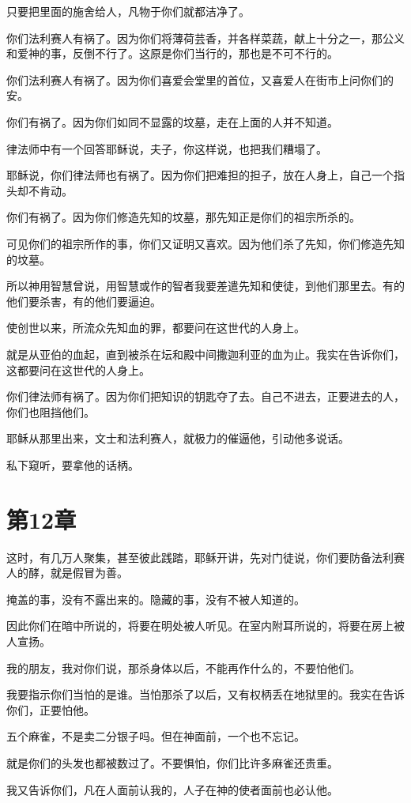 \documentclass[12pt,oneside]{book}
\begin{document}
只要把里面的施舍给人，凡物于你们就都洁净了。

你们法利赛人有祸了。因为你们将薄荷芸香，并各样菜蔬，献上十分之一，那公义和爱神的事，反倒不行了。这原是你们当行的，那也是不可不行的。

你们法利赛人有祸了。因为你们喜爱会堂里的首位，又喜爱人在街市上问你们的安。

你们有祸了。因为你们如同不显露的坟墓，走在上面的人并不知道。

律法师中有一个回答耶稣说，夫子，你这样说，也把我们糟塌了。

耶稣说，你们律法师也有祸了。因为你们把难担的担子，放在人身上，自己一个指头却不肯动。

你们有祸了。因为你们修造先知的坟墓，那先知正是你们的祖宗所杀的。

可见你们的祖宗所作的事，你们又证明又喜欢。因为他们杀了先知，你们修造先知的坟墓。

所以神用智慧曾说，用智慧或作的智者我要差遣先知和使徒，到他们那里去。有的他们要杀害，有的他们要逼迫。

使创世以来，所流众先知血的罪，都要问在这世代的人身上。

就是从亚伯的血起，直到被杀在坛和殿中间撒迦利亚的血为止。我实在告诉你们，这都要问在这世代的人身上。

你们律法师有祸了。因为你们把知识的钥匙夺了去。自己不进去，正要进去的人，你们也阻挡他们。

耶稣从那里出来，文士和法利赛人，就极力的催逼他，引动他多说话。

私下窥听，要拿他的话柄。

\chapter{第12章}
这时，有几万人聚集，甚至彼此践踏，耶稣开讲，先对门徒说，你们要防备法利赛人的酵，就是假冒为善。

掩盖的事，没有不露出来的。隐藏的事，没有不被人知道的。

因此你们在暗中所说的，将要在明处被人听见。在室内附耳所说的，将要在房上被人宣扬。

我的朋友，我对你们说，那杀身体以后，不能再作什么的，不要怕他们。

我要指示你们当怕的是谁。当怕那杀了以后，又有权柄丢在地狱里的。我实在告诉你们，正要怕他。

五个麻雀，不是卖二分银子吗。但在神面前，一个也不忘记。

就是你们的头发也都被数过了。不要惧怕，你们比许多麻雀还贵重。

我又告诉你们，凡在人面前认我的，人子在神的使者面前也必认他。
\end{document}
